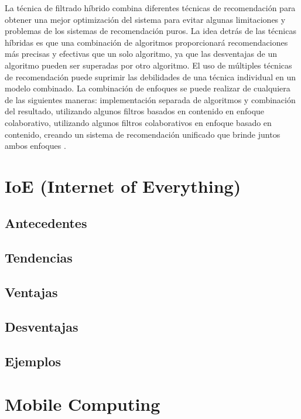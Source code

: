 La técnica de filtrado híbrido combina diferentes técnicas de recomendación para obtener una mejor optimización del sistema para evitar algunas limitaciones y problemas de los sistemas de recomendación puros. La idea detrás de las técnicas híbridas es que una combinación de algoritmos proporcionará recomendaciones más precisas y efectivas que un solo algoritmo, ya que las desventajas de un algoritmo pueden ser superadas por otro algoritmo. El uso de múltiples técnicas de recomendación puede suprimir las debilidades de una técnica individual en un modelo combinado. La combinación de enfoques se puede realizar de cualquiera de las siguientes maneras: implementación separada de algoritmos y combinación del resultado, utilizando algunos filtros basados en contenido en enfoque colaborativo, utilizando algunos filtros colaborativos en enfoque basado en contenido, creando un sistema de recomendación unificado que brinde juntos ambos enfoques \cite{Isinkaye}.


\newpage
\section{IoE (Internet of Everything)}
\subsection{Antecedentes}
\subsection{Tendencias}
\subsection{Ventajas}
\subsection{Desventajas}
\subsection{Ejemplos}

\section{Mobile Computing}
